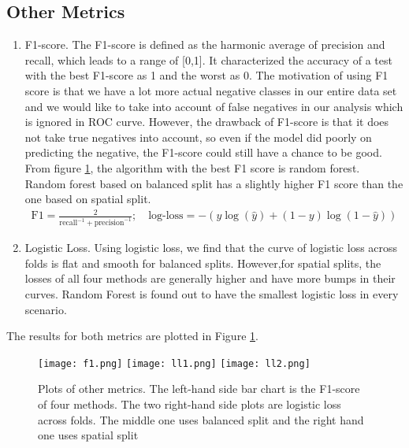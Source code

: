 \documentclass[letterpaper,11pt]{article}
\begin{document}
\subsection{Other Metrics}
\begin{enumerate}
    \item F1-score. The F1-score is defined as the harmonic average of precision and recall, which leads to a range of [0,1]. It characterized the accuracy of a test with the best F1-score as 1 and the worst as 0. The motivation of using F1 score is that we have a lot more actual negative classes in our entire data set and we would like to take into account of false negatives in our analysis which is ignored in ROC curve. However, the drawback of F1-score is that it does not take true negatives into account, so even if the model did poorly on predicting the negative, the F1-score could still have a chance to be good. From figure \ref{fig:metrics}, the algorithm with the best F1 score is random forest. Random forest based on balanced split has a slightly higher F1 score than the one based on spatial split. 
    \begin{align*}
    \text{F1} = \frac{2}{\text{recall}^{-1}+\text{precision}^{-1}} ; \quad \text{log-loss} =  -(y\log(\hat y) + (1 - y) \log(1 - \hat y))
    \end{align*}
    
    \item Logistic Loss. Using logistic loss, we find that the curve of logistic loss across folds is flat and smooth for balanced splits. However,for spatial splits, the losses of all four methods are generally higher and have more bumps in their curves. Random Forest is found out to have the smallest logistic loss in every scenario.
\end{enumerate}
The results for both metrics are plotted in Figure \ref{fig:metrics}.

\begin{figure}[!hbt]
    \centering
    \texttt{[image: f1.png]}
    \texttt{[image: ll1.png]}
    \texttt{[image: ll2.png]}
    \caption{Plots of other metrics. The left-hand side bar chart is the F1-score of four methods. The two right-hand side plots are logistic loss across folds. The middle one uses balanced split and the right hand one uses spatial split}
    \label{fig:metrics}
\end{figure}
\end{document}
